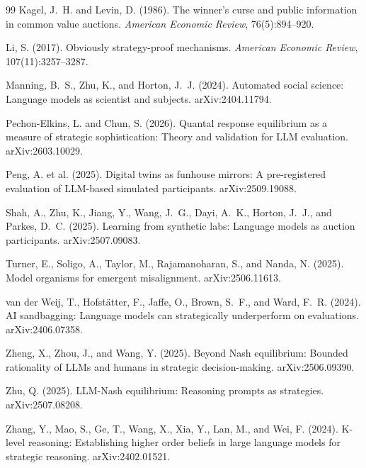 \begin{thebibliography}{99}
Kagel, J.~H. and Levin, D. (1986).
The winner's curse and public information in common value auctions.
\emph{American Economic Review}, 76(5):894--920.

Li, S. (2017).
Obviously strategy-proof mechanisms.
\emph{American Economic Review}, 107(11):3257--3287.

Manning, B.~S., Zhu, K., and Horton, J.~J. (2024).
Automated social science: Language models as scientist and subjects.
arXiv:2404.11794.

Pechon-Elkins, L. and Chun, S. (2026).
Quantal response equilibrium as a measure of strategic sophistication:
Theory and validation for LLM evaluation.
arXiv:2603.10029.

Peng, A. et al. (2025).
Digital twins as funhouse mirrors: A pre-registered evaluation of
LLM-based simulated participants.
arXiv:2509.19088.

Shah, A., Zhu, K., Jiang, Y., Wang, J.~G., Dayi, A.~K., Horton, J.~J.,
and Parkes, D.~C. (2025).
Learning from synthetic labs: Language models as auction participants.
arXiv:2507.09083.

Turner, E., Soligo, A., Taylor, M., Rajamanoharan, S., and Nanda, N.
(2025).
Model organisms for emergent misalignment.
arXiv:2506.11613.

van der Weij, T., Hofst\"atter, F., Jaffe, O., Brown, S.~F., and
Ward, F.~R. (2024).
AI sandbagging: Language models can strategically underperform on
evaluations.
arXiv:2406.07358.

Zheng, X., Zhou, J., and Wang, Y. (2025).
Beyond Nash equilibrium: Bounded rationality of LLMs and humans in
strategic decision-making.
arXiv:2506.09390.

Zhu, Q. (2025).
LLM-Nash equilibrium: Reasoning prompts as strategies.
arXiv:2507.08208.


Zhang, Y., Mao, S., Ge, T., Wang, X., Xia, Y., Lan, M., and Wei, F.
(2024).
K-level reasoning: Establishing higher order beliefs in large language
models for strategic reasoning.
arXiv:2402.01521.


\end{thebibliography}
